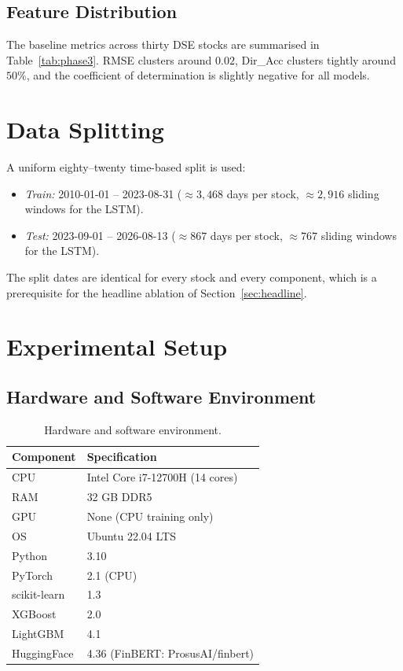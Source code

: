\documentclass[12pt,a4paper,oneside]{report}
\begin{document}
\subsection{Feature Distribution}

The baseline metrics across thirty DSE stocks are summarised in
Table~\ref{tab:phase3}. \ac{RMSE} clusters around $0.02$,
Dir\_Acc clusters tightly around $50\%$, and the coefficient of
determination is slightly negative for all models.

\section{Data Splitting}

A uniform eighty--twenty time-based split is used:
\begin{itemize}[leftmargin=*,itemsep=2pt]
  \item \emph{Train:} 2010-01-01 -- 2023-08-31
        ($\approx 3{,}468$ days per stock, $\approx 2{,}916$
        sliding windows for the \ac{LSTM}).
  \item \emph{Test:} 2023-09-01 -- 2026-08-13
        ($\approx 867$ days per stock, $\approx 767$ sliding
        windows for the \ac{LSTM}).
\end{itemize}

The split dates are identical for every stock and every component,
which is a prerequisite for the headline ablation of
Section~\ref{sec:headline}.

\section{Experimental Setup}

\subsection{Hardware and Software Environment}

\begin{table}[H]
  \centering
  \caption{Hardware and software environment.}
  \label{tab:env}
  \begin{tabular}{ll}
    \toprule
    Component & Specification \\
    \midrule
    CPU            & Intel Core i7-12700H (14 cores) \\
    RAM            & 32 GB DDR5 \\
    GPU            & None (CPU training only) \\
    OS             & Ubuntu 22.04 LTS \\
    Python         & 3.10 \\
    PyTorch        & 2.1 (CPU) \\
    scikit-learn   & 1.3 \\
    XGBoost        & 2.0 \\
    LightGBM       & 4.1 \\
    HuggingFace    & 4.36 (FinBERT: ProsusAI/finbert) \\
    \bottomrule
  \end{tabular}
\end{table}
\end{document}
